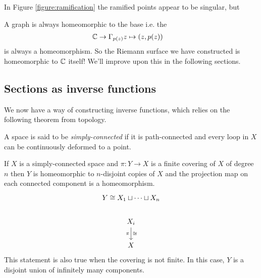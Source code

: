 In Figure \ref{figure:ramification} the ramified points appear to be singular, but

A graph is always homeomorphic to the base i.e. the
\begin{align*}
  \mathbb{C} &\rightarrow \Gamma_{p(z)}
  z \mapsto (z, p(z))
\end{align*}
is always a homeomorphism.
So the Riemann surface we have constructed is homeomorphic to $\mathbb{C}$ itself!
We'll improve upon this in the following sections.










\subsection{Sections as inverse functions}
We now have a way of constructing inverse functions, which relies on the following theorem from topology.

A space is said to be \emph{simply-connected} if it is path-connected and every loop in $X$ can be continuously deformed to a point.

\begin{theorem}
  If $X$ is a simply-connected space and $\pi:Y \rightarrow X$ is a finite covering of $X$ of degree $n$ then $Y$ is homeomorphic to $n$-disjoint copies of $X$ and the projection map on each connected component is a homeomorphism.
  \begin{equation*}
    \begin{tikzcd}
      Y \cong X_1 \sqcup \dots \sqcup X_n\\
      X_i
      \ar[d, "\cong", "\pi"'] \\
      X
    \end{tikzcd}
  \end{equation*}
  This statement is also true when the covering is not finite. In this case, $Y$ is a disjoint union of infinitely many components.
\end{theorem}

